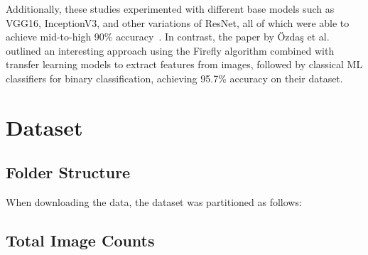 \documentclass[11pt]{article}
\begin{document}
Additionally, these studies experimented with different base models such as VGG16, InceptionV3, and other variations of ResNet, all of which were able to achieve mid-to-high 90\% accuracy~\citep{9002415,Kermany2018-dc,Miladinovic2024-og}. In contrast, the paper by Özdaş et al.~\citeyearpar{diagnostics13030433} outlined an interesting approach using the Firefly algorithm combined with transfer learning models to extract features from images, followed by classical ML classifiers for binary classification, achieving 95.7\% accuracy on their dataset.


\section{Dataset}

\subsection{Folder Structure}

When downloading the data, the dataset was partitioned as follows:


\vspace*{5cm} %

\subsection{Total Image Counts}
\end{document}
